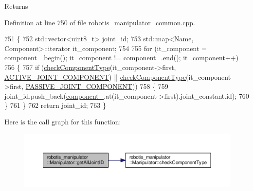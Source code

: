\begin{DoxyReturn}{Returns}

\end{DoxyReturn}


Definition at line 750 of file robotis\+\_\+manipulator\+\_\+common.\+cpp.


\begin{DoxyCode}
751 \{
752   std::vector<uint8\_t> joint\_id;
753   std::map<Name, Component>::iterator it\_component;
754 
755   \textcolor{keywordflow}{for} (it\_component = \hyperlink{classrobotis__manipulator_1_1_manipulator_a20b388b821f161972c2cf737fe1c26db}{component\_}.begin(); it\_component != \hyperlink{classrobotis__manipulator_1_1_manipulator_a20b388b821f161972c2cf737fe1c26db}{component\_}.end(); 
      it\_component++)
756   \{
757     \textcolor{keywordflow}{if} (\hyperlink{classrobotis__manipulator_1_1_manipulator_a5b1f27b9cc2875b4e0275e3b88ab1b28}{checkComponentType}(it\_component->first, 
      \hyperlink{namespacerobotis__manipulator_a2bbf89d1c08dc1d9ff4e28beb939e382acdf3b34914d1a2a028d882beb96fba7c}{ACTIVE\_JOINT\_COMPONENT}) || \hyperlink{classrobotis__manipulator_1_1_manipulator_a5b1f27b9cc2875b4e0275e3b88ab1b28}{checkComponentType}(it\_component->first, 
      \hyperlink{namespacerobotis__manipulator_a2bbf89d1c08dc1d9ff4e28beb939e382a48d9e14bdd971b547f0b4bfcbf8588e7}{PASSIVE\_JOINT\_COMPONENT}))
758     \{
759       joint\_id.push\_back(\hyperlink{classrobotis__manipulator_1_1_manipulator_a20b388b821f161972c2cf737fe1c26db}{component\_}.at(it\_component->first).joint\_constant.id);
760     \}
761   \}
762   \textcolor{keywordflow}{return} joint\_id;
763 \}
\end{DoxyCode}


Here is the call graph for this function\+:\nopagebreak
\begin{figure}[H]
\begin{center}
\leavevmode
\includegraphics[width=350pt]{classrobotis__manipulator_1_1_manipulator_a689daa284722f6b940e1196dd3dde43e_cgraph}
\end{center}
\end{figure}


